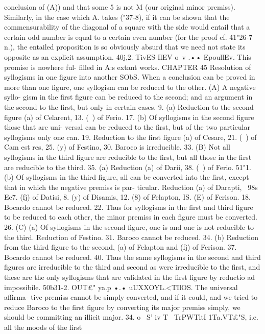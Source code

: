{{{{{{{{{{{{{{{{{{{{{{{{{{{{{{{{{{{{{{conclusion of (A)) and that some 5 is not M (our original minor
premiss). Similarly, in the case which A. takes ("37-8), if it can
be shown that the commensurability of the diagonal of a square
with the side would entail that a certain odd number is equal to
a certain even number (for the proof cf. 41"26-7 n.), the entailed
proposition is so obviously absurd that we need not state its
opposite as an explicit assumption.
40j,2. TivES IlEV o~v .•• EpoullEv. This promise is nowhere ful-
filled in A:s extant works.
CHAPTER 45
Resolution of syllogisms in one figure into another
SObS. When a conclusion can be proved in more than one figure,
one syllogism can be reduced to the other. (A) A negative syllo-
gism in the first figure can be reduced to the second; and an
argument in the second to the first, but only in certain cases.
9. (a) Reduction to the second figure (a) of Celarent,
13. (~) of Ferio.
17. (b) Of syllogisms in the second figure those that are uni-
versal can be reduced to the first, but of the two particular
syllogisms only one can.
19. Reduction to the first figure (a) of Cesare,
21. (~) of Cam est res,
25. (y) of Festino,
30. Baroco is irreducible.
33. (B) Not all syllogisms in the third figure are reducible to the
first, but all those in the first are reducible to the third.
35. (a) Reduction (a) of Darii,
38. (~) of Ferio.
51"1. (b) Of syllogisms in the third figure, all can be converted
into the first, except that in which the negative premiss is par-
ticular. Reduction (a) of Darapti,
~98s
Ee7. (fj) of Datisi,
8. (y) of Disamis,
12. (8) of Felapton,
IS. (E) of Ferison.
18. Bocardo cannot be reduced.
22. Thus for syllogisms in the first and third figure to be
reduced to each other, the minor premiss in each figure must be
converted.
26. (C) (a) Of syllogisms in the second figure, one is and one is
not reducible to the third. Reduction of Festino.
31. Baroco cannot be reduced.
34. (b) Reduction from the third figure to the second, (a) of
Felapton and (fj) of Ferison.
37. Bocardo cannot be reduced.
40. Thus the same syllogisms in the second and third figures
are irreducible to the third and second as were irreducible to the
first, and these are the only syllogisms that are validated in the
first figure by reductio ad impossibile.
50b31-2. OUT£" ya.p •.• uUXXOYL.<TIlOS. The universal affirma-
tive premiss cannot be simply converted, and if it could, and we
tried to reduce Baroco to the first figure by converting its major
premiss simply, we should be committing an illicit major.
34. o~ S' iv T~ TrPWTltI 1Ta.VT£"S, i.e. all the moods of the first
}}}}}}}}}}}}}}}}}}}}}}}}}}}}}}}}}}}}}}
